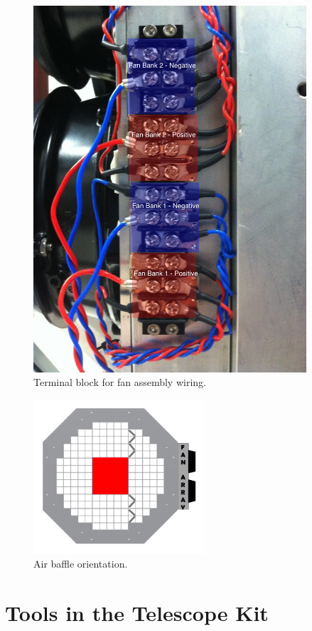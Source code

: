 \documentclass[11pt]{article}
\begin{document}
\begin{figure}[h]
\begin{center}
\includegraphics[width = 4in]{fanWiring.jpg}
\caption{Terminal block for fan assembly wiring.}  
\label{fanPic}
\end{center}
\end{figure}

\begin{figure}[h]
\begin{center}
\includegraphics[width = 2.5in]{baffles.png}
\caption{Air baffle orientation.}  
\label{bafflePic}
\end{center}
\end{figure}



\newpage
\section{Tools in the Telescope Kit}
\end{document}

